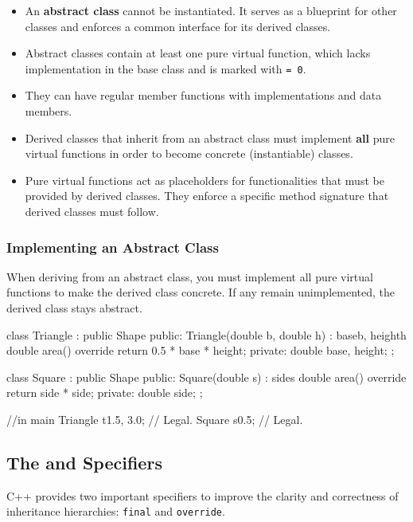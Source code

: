 \begin{itemize}
    \item An \textbf{abstract class} cannot be instantiated. It serves as a blueprint for other classes and enforces a common interface for its derived classes.
    \item Abstract classes contain at least one pure virtual function, which lacks implementation in the base class and is marked with \texttt{= 0}.
    \item They can have regular member functions with implementations and data members.
    \item Derived classes that inherit from an abstract class must implement \textbf{all} pure virtual functions in order to become concrete (instantiable) classes.
    \item Pure virtual functions act as placeholders for functionalities that must be provided by derived classes. They enforce a specific method signature that derived classes must follow.
\end{itemize}

\subsubsection{Implementing an Abstract Class}

When deriving from an abstract class, you must implement all pure virtual functions to make the derived class concrete. If any remain unimplemented, the derived class stays abstract.

\begin{codeblock}[language=C++]
class Triangle : public Shape {
public:
    Triangle(double b, double h) : base{b}, height{h} {}
    double area() override { return 0.5 * base * height; }
private:
    double base, height;
};

class Square : public Shape {
public:
    Square(double s) : side{s} {}
    double area() override { return side * side; }
private:
    double side;
};

//in main
Triangle t{1.5, 3.0}; // Legal.
Square s{0.5}; // Legal.
\end{codeblock}

\subsection{The  and  Specifiers}

C++ provides two important specifiers to improve the clarity and correctness of inheritance hierarchies: \texttt{final} and \texttt{override}.


